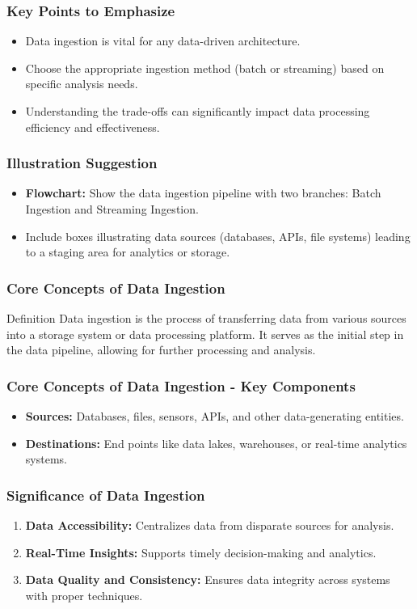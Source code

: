 \documentclass[aspectratio=169]{beamer}
\begin{document}
\begin{frame}[fragile]
    \frametitle{Key Points to Emphasize}
    \begin{itemize}
        \item Data ingestion is vital for any data-driven architecture.
        \item Choose the appropriate ingestion method (batch or streaming) based on specific analysis needs.
        \item Understanding the trade-offs can significantly impact data processing efficiency and effectiveness.
    \end{itemize}
\end{frame}

\begin{frame}[fragile]
    \frametitle{Illustration Suggestion}
    \begin{itemize}
        \item \textbf{Flowchart:} Show the data ingestion pipeline with two branches: Batch Ingestion and Streaming Ingestion.
        \item Include boxes illustrating data sources (databases, APIs, file systems) leading to a staging area for analytics or storage.
    \end{itemize}
\end{frame}

\begin{frame}[fragile]
    \frametitle{Core Concepts of Data Ingestion}
    \begin{block}{Definition}
        Data ingestion is the process of transferring data from various sources into a storage system or data processing platform. It serves as the initial step in the data pipeline, allowing for further processing and analysis.
    \end{block}
\end{frame}

\begin{frame}[fragile]
    \frametitle{Core Concepts of Data Ingestion - Key Components}
    \begin{itemize}
        \item \textbf{Sources:} Databases, files, sensors, APIs, and other data-generating entities.
        \item \textbf{Destinations:} End points like data lakes, warehouses, or real-time analytics systems.
    \end{itemize}
\end{frame}

\begin{frame}[fragile]
    \frametitle{Significance of Data Ingestion}
    \begin{enumerate}
        \item \textbf{Data Accessibility:} Centralizes data from disparate sources for analysis.
        \item \textbf{Real-Time Insights:} Supports timely decision-making and analytics.
        \item \textbf{Data Quality and Consistency:} Ensures data integrity across systems with proper techniques.
    \end{enumerate}
\end{frame}
\end{document}
